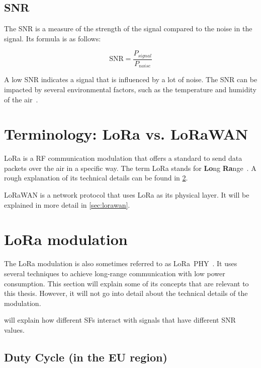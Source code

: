 \subsection{\acf{SNR}}

The \acf{SNR} is a measure of the strength of the signal compared to the noise in the signal.
Its formula is as follows:

\begin{equation}
    \text{SNR} = \frac{P_{signal}}{P_{noise}}
\end{equation}

A low \ac{SNR} indicates a signal that is influenced by a lot of noise.
The \ac{SNR} can be impacted by several environmental factors, such as the temperature and humidity of the air~\cite{jeftenic_impact_2020}.

\section{Terminology: \acs{LoRa} vs. \acs{LoRaWAN}}

\ac{LoRa} is a \ac{RF} communication modulation that offers a standard to send data packets over the air in a specific way.
The term \ac{LoRa} stands for \textbf{Lo}ng \textbf{Ra}nge~\cite{semtech_corporation_lora_2023}.
A rough explanation of its technical details can be found in \cref{sec:lora-modulation}.

\ac{LoRaWAN} is a network protocol that uses \ac{LoRa} as its physical layer.
It will be explained in more detail in \cref{sec:lorawan}.

\section{\acf{LoRa} modulation}\label{sec:lora-modulation}

The \ac{LoRa} modulation is also sometimes referred to as \ac{LoRa}\ PHY~\cite{chaudhari_understanding_2022}.
It uses several techniques to achieve long-range communication with low power consumption.
This section will explain some of its concepts that are relevant to this thesis.
However, it will not go into detail about the technical details of the modulation.

 will explain how different \acfp{SF} interact with signals that have different \ac{SNR} values.

\subsection{Duty Cycle (in the \acs{EU} region)}\label{sec:duty-cycle}


